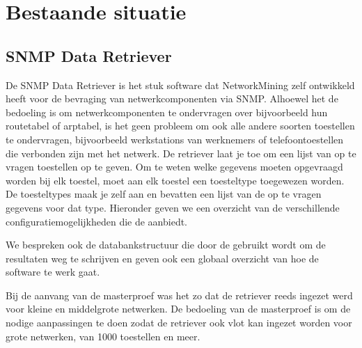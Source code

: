 \chapter{Bestaande situatie}


\section{SNMP Data Retriever}
\label{snmp-data-retriever}
De SNMP Data Retriever is het stuk software dat NetworkMining zelf ontwikkeld heeft voor de bevraging van netwerkcomponenten via SNMP.
Alhoewel het de bedoeling is om netwerkcomponenten te ondervragen over bijvoorbeeld hun routetabel of \gls{arptabel},
is het geen probleem om ook alle andere soorten toestellen te ondervragen, bijvoorbeeld werkstations van werknemers of
telefoontoestellen die verbonden zijn met het netwerk. De retriever laat je toe om een lijst van op te vragen toestellen op te geven.
Om te weten welke gegevens moeten opgevraagd worden bij elk toestel, moet aan elk toestel een toesteltype toegewezen worden.
De toesteltypes maak je zelf aan en bevatten een lijst van de op te vragen gegevens voor dat type.
Hieronder geven we een overzicht van de verschillende configuratiemogelijkheden die de \nwmretriever{} aanbiedt.

We bespreken ook de databankstructuur die door de \nwmretriever{} gebruikt wordt om de resultaten weg te schrijven
en geven ook een globaal overzicht van hoe de software te werk gaat.

Bij de aanvang van de masterproef was het zo dat de retriever reeds ingezet werd voor kleine en middelgrote netwerken.
De bedoeling van de masterproef is om de nodige aanpassingen te doen zodat de retriever ook vlot kan ingezet worden voor grote netwerken,
van 1000 toestellen en meer.



